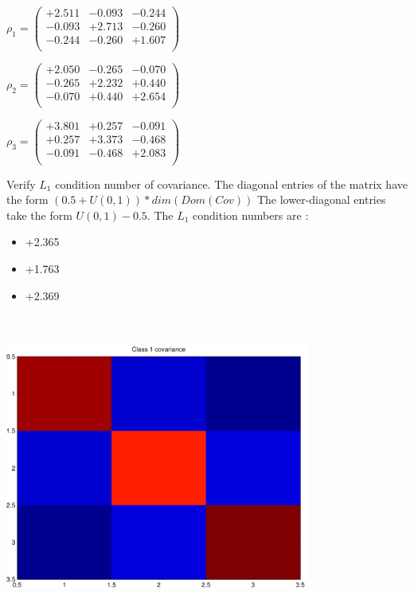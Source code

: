 \documentclass[9pt]{article}
\theoremstyle{plain}
\theoremstyle{definition}
\theoremstyle{remark}
\numberwithin{equation}{section}
\begin{document}
$\rho_1 = \left(
\begin{array}{
ccc}
+2.511 & -0.093 & -0.244 \\
-0.093 & +2.713 & -0.260 \\
-0.244 & -0.260 & +1.607 \\
\end{array}
\right)$ \newline 

$\rho_2 = \left(
\begin{array}{
ccc}
+2.050 & -0.265 & -0.070 \\
-0.265 & +2.232 & +0.440 \\
-0.070 & +0.440 & +2.654 \\
\end{array}
\right)$ \newline 

$\rho_3 = \left(
\begin{array}{
ccc}
+3.801 & +0.257 & -0.091 \\
+0.257 & +3.373 & -0.468 \\
-0.091 & -0.468 & +2.083 \\
\end{array}
\right)$ \newline 

Verify $L_1$ condition number of covariance. The diagonal entries of the matrix have the form $(0.5 + U(0,1) )*dim(Dom(Cov))$
The lower-diagonal entries take the form $U(0,1) - 0.5$. 
The $L_1$ condition numbers are :
\begin{itemize}
\item +2.365
\item +1.763
\item +2.369
\end{itemize}
\includegraphics[width=10.0cm,height=10.0cm]{rv1_corr.pdf}
\end{document}
